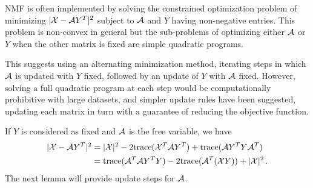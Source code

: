 NMF is often implemented by solving the constrained optimization problem of minimizing 
$|{\mathcal X} - {\mathcal A} Y^T|^2$ subject to ${\mathcal A}$ and $Y$ having non-negative entries. 
 This problem is non-convex in general but the sub-problems of optimizing either ${\mathcal A}$ or $Y$ when the other matrix is fixed are simple quadratic programs.



 This suggests using an alternating minimization method,  iterating steps in which ${\mathcal A}$ is updated with $Y$ fixed, followed by an update of $Y$ with ${\mathcal A}$ fixed. 
However,  solving a full quadratic program at each step would be computationally prohibitive with large datasets, and simpler update rules have been suggested, updating each matrix in turn with a guarantee  of reducing the objective function.


If $Y$ is considered as fixed and ${\mathcal A}$ is the free variable, we have
\begin{align*}
|{\mathcal X} - {\mathcal A} Y^T|^2 &= |{\mathcal X}|^2 - 2 {\mathrm{trace}}({\mathcal X}^T{\mathcal A} Y^T) + {\mathrm{trace}}({\mathcal A} Y^TY{\mathcal A}^T)\\
&= {\mathrm{trace}}({\mathcal A}^T {\mathcal A} Y^T Y) - 2{\mathrm{trace}}({\mathcal A}^T({\mathcal X} Y)) + |{\mathcal X}|^2\,.
\end{align*}
The next lemma will provide update steps for ${\mathcal A}$.

